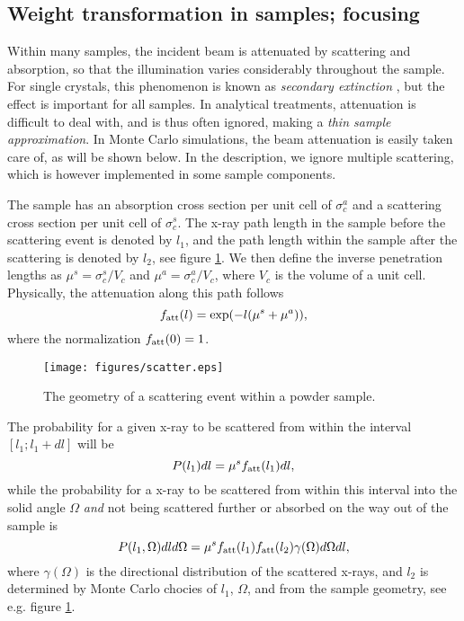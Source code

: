 \subsection{Weight transformation in samples; focusing}

Within many samples,
the incident beam is attenuated by scattering and absorption,
so that the illumination varies considerably throughout the sample.
For single crystals, this phenomenon is known as
{\em secondary extinction} \cite{bacon}, but the effect is
important for all samples.
In analytical treatments, attenuation is difficult to deal with,
and is thus often ignored, making a {\em thin sample approximation}.
In Monte Carlo simulations, the beam attenuation
is easily taken care of, as will be shown below.
In the description, we ignore multiple scattering, which is however
 implemented in some sample components.

The sample has an absorption cross section per unit cell of
$\sigma_c^a$ and a scattering cross section per unit cell
of $\sigma_c^s$. The x-ray path length
in the sample before the scattering event is denoted by $l_1$, and
the path length within the sample after the scattering
is denoted by $l_2$, see figure \ref{powderFig}.
We then define the inverse penetration lengths as
$\mu^s = \sigma_c^s / V_c$ and $\mu^a = \sigma_c^a / V_c$, where
$V_c$ is the volume of a unit cell. Physically, the attenuation
along this path follows
\begin{equation}
f_{\rm att}(l) = \exp(- l (\mu^s + \mu^a)) ,
\end{equation}
where the normalization $f_{\rm att}(0)=1$.

\begin{figure}
  \begin{center}
    \texttt{[image: figures/scatter.eps]}
  \end{center}
\caption{The geometry of a scattering event within a powder sample.}
\label{powderFig}
\end{figure}

The probability for a given x-ray to be scattered from within the interval
$[ l_1 ; l_1+dl ]$ will be
\begin{equation}
P(l_1) dl = \mu^s f_{\rm att}(l_1) dl ,
\end{equation}
while the probability for a x-ray to be scattered from within
this interval into the solid angle $\Omega$ {\em and}
not being scattered further
or absorbed on the way out of the sample is
\begin{equation}
P(l_1,\Omega) dl d\Omega =
  \mu^s f_{\rm att}(l_1) f_{\rm att}(l_2) \gamma(\Omega) d\Omega dl ,
\end{equation}
where $\gamma(\Omega)$ is the directional distribution
of the scattered x-rays, and $l_2$ is determined by
Monte Carlo chocies of $l_1$, $\Omega$,
and from the sample geometry, see e.g. figure \ref{powderFig}.

